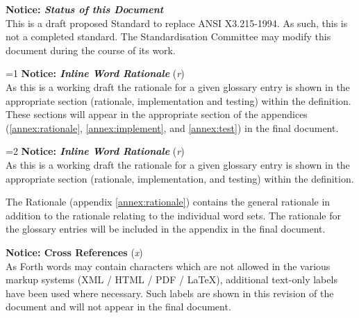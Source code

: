 \begin{titlepage}
\textbf{Notice: \emph{Status of this Document}} \\
This is a draft proposed Standard to replace ANSI X3.215-1994. As
such, this is not a completed standard. The Standardisation Committee
may modify this document during the course of its work.


%
%

\ifnum\value{part}=1
	\ifinline
\textbf{Notice: \emph{Inline Word Rationale}} (\textit{r}) \\
As this is a working draft the rationale for a given glossary
entry is shown in the appropriate section (rationale,
implementation and testing) within the definition.
These sections will appear in the appropriate section of
the appendices (\ref{annex:rationale}, \ref{annex:implement},
and \ref{annex:test}) in the final document.
	\fi
\fi


%
%

\ifnum\value{part}=2
	\ifinline
\textbf{Notice: \emph{Inline Word Rationale}} (\textit{r}) \\
As this is a working draft the rationale for a given glossary
entry is shown in the appropriate section (rationale,
implementation, and testing) within the definition.

The Rationale (appendix \ref{annex:rationale}) contains the
general rationale in addition to the rationale relating to
the individual word sets.
The rationale for the glossary entries will be included in
the appendix in the final document.
	\fi
\fi


\ifshowref
\textbf{Notice: Cross References} (\textit{x}) \\
As Forth words may contain characters which are not allowed in the
various markup systems (XML / HTML / PDF / \LaTeX), additional
text-only labels have been used where necessary. Such labels are
shown in this revision of the document and will not appear in the
final document.
\fi
\end{titlepage}
